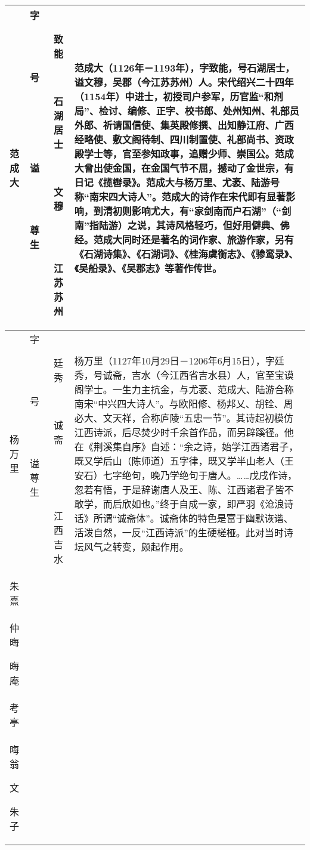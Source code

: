 \begin{longtable}{|>{\centering\namefont\heiti}m{2em}|>{\centering\tiny}m{3.0em}|>{\xzfont\kaiti}m{7em}|}
  范成大 & \begin{description}
  \item[字] 致能
  \item[号] 石湖居士
  \item[谥] 文穆
  \item[尊] 
  \item[生] 江苏苏州
  \end{description} & 范成大（1126年－1193年），字致能，号石湖居士，谥文穆，吴郡（今江苏苏州）人。宋代绍兴二十四年（1154年）中进士，初授司户参军，历官监“和剂局”、检讨、编修、正字、校书郎、处州知州、礼部员外郎、祈请国信使、集英殿修撰、出知静江府、广西经略使、敷文阁待制、四川制置使、礼部尚书、资政殿学士等，官至参知政事，追赠少师、崇国公。范成大曾出使金国，在金国气节不屈，撼动了金世宗，有日记《揽辔录》。范成大与杨万里、尤袤、陆游号称“南宋四大诗人”。范成大的诗作在宋代即有显著影响，到清初则影响尤大，有“家剑南而户石湖”（“剑南”指陆游）之说，其诗风格轻巧，但好用僻典、佛经。范成大同时还是著名的词作家、旅游作家，另有《石湖诗集》、《石湖词》、《桂海虞衡志》、《骖鸾录》、《吴船录》、《吴郡志》等著作传世。 \tabularnewline\hline
  杨万里 & \begin{description}
  \item[字] 廷秀
  \item[号] 诚斋
  \item[谥] 
  \item[尊] 
  \item[生] 江西吉水
  \end{description} & 杨万里（1127年10月29日－1206年6月15日），字廷秀，号诚斋，吉水（今江西省吉水县）人，官至宝谟阁学士。一生力主抗金，与尤袤、范成大、陆游合称南宋“中兴四大诗人”。与欧阳修、杨邦乂、胡铨、周必大、文天祥，合称庐陵“五忠一节”。其诗起初模仿江西诗派，后尽焚少时千余首作品，而另辟蹊径。他在《荆溪集自序》自述：“余之诗，始学江西诸君子，既又学后山（陈师道）五字律，既又学半山老人（王安石）七字绝句，晚乃学绝句于唐人。……戊戌作诗，忽若有悟，于是辞谢唐人及王、陈、江西诸君子皆不敢学，而后欣如也。”终于自成一家，即严羽《沧浪诗话》所谓“诚斋体”。诚斋体的特色是富于幽默诙谐、活泼自然，一反“江西诗派”的生硬槎桠。此对当时诗坛风气之转变，颇起作用。 \tabularnewline\hline
  朱熹 & \begin{description}
  \item[字] 元晦\\仲晦
  \item[号] 晦庵\\考亭\\晦翁
  \item[谥] 文
  \item[尊] 朱子

\end{description}
\end{longtable}
